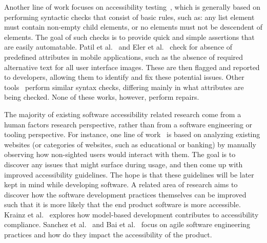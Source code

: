 Another line of work focuses on accessibility testing~\cite{abascal2019tools, 
ukgov:audit:2018}, which is generally based on performing syntactic checks 
that consist of basic rules, such as:  any  list element must contain 
non-empty  child elements, or no  elements must not be 
descendent of  elements. The goal of such checks is to provide quick 
and simple assertions that are easily automatable.
Patil et al.~\cite{patil2016enhanced} and Eler et al.~\cite{eler2018automated} 
check for absence of predefined attributes in mobile applications, 
such as the absence of required alternative text for all user interface images. 
These are then flagged and reported to developers, allowing them to identify 
and fix these potential issues. Other tools~\cite{aslint_tool,goog_scanner} 
perform similar syntax checks, differing mainly in what attributes are being checked. 
None of these works, however, perform repairs. 

The majority of existing software accessibility related research  
come from a human factors research perspective, rather than from a 
software engineering or tooling perspective.
For instance, one line of work~\cite{snider2020accessibility, alshayban2020accessibility, 
yan2019current, bhagat2019evaluation,ross2018examining,agrawal2019evaluating,dominguez2018website} 
is based on analyzing existing websites (or categories of websites, 
such as educational or banking) by manually 
observing how non-sighted users would interact with them. 
The goal is to discover any issues that might surface during usage, 
and then come up with improved accessibility guidelines. 
The hope is that these guidelines will be later kept in mind while 
developing software. 
A related area of research aims to discover how the software development 
practices themselves can be improved such that it is more likely that 
the end product software is more accessible. 
Krainz et al.~\cite{krainz2018can} explores how model-based development 
contributes to accessibility compliance. 
Sanchez et al.~\cite{sanchez2017method} and Bai et al.~\cite{bai2018categorization, 
bai2019methods} focus on agile software engineering practices and how do they 
impact the accessibility of the product.  

